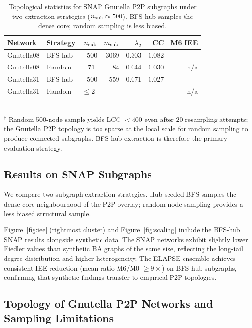\documentclass[review,12pt]{elsarticle}
\newcommand{\lambdat}{\lambda_2}
\begin{document}
\begin{table}[htbp]
  \caption{Topological statistics for SNAP Gnutella P2P subgraphs under
           two extraction strategies ($n_{\rm sub} \approx 500$).
           BFS-hub samples the dense core; random sampling is less biased.}
  \label{tab:snap_stats}
  \centering
  \small
  \renewcommand{\arraystretch}{1.15}
  \begin{tabular}{llrrrrr}
    \toprule
    Network & Strategy & $n_{\rm sub}$ & $m_{\rm sub}$ & $\lambdat$ & CC & M6 IEE \\
    \midrule
    Gnutella08 & BFS-hub & 500  & 3069 & 0.303 & 0.082 &  \\
    Gnutella08 & Random  & 71$^\dagger$  & 84   & 0.044 & 0.030 & n/a \\
    Gnutella31 & BFS-hub & 500  & 559  & 0.071 & 0.027 &  \\
    Gnutella31 & Random  & $\leq$2$^\dagger$ & -- & --  & --    & n/a \\
    \bottomrule
  \end{tabular}
  \medskip\\
  \small$^\dagger$ Random 500-node sample yields LCC $< 400$ even after 20 resampling
  attempts; the Gnutella P2P topology is too sparse at the local scale for
  random sampling to produce connected subgraphs.  BFS-hub extraction is
  therefore the primary evaluation strategy.
\end{table}

\subsection{Results on SNAP Subgraphs}
\label{sec:snap_results}

We compare two subgraph extraction strategies. Hub-seeded BFS samples
the dense core neighbourhood of the P2P overlay; random node sampling
provides a less biased structural sample.

Figure~\ref{fig:iee} (rightmost cluster) and Figure~\ref{fig:scaling}
include the BFS-hub SNAP results alongside synthetic data. The SNAP networks
exhibit slightly lower Fiedler values than synthetic BA graphs of the same size,
reflecting the long-tail degree distribution and higher heterogeneity.
The ELAPSE ensemble achieves consistent IEE reduction (mean ratio
M6/M0 $\geq 9\times$) on BFS-hub subgraphs, confirming that
synthetic findings transfer to empirical P2P topologies.

\subsection{Topology of Gnutella P2P Networks and Sampling Limitations}
\label{sec:snap_topology}
\end{document}
